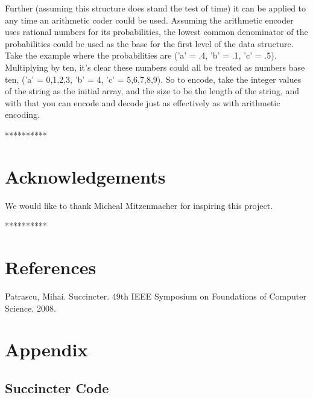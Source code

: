 \documentclass{article}
\begin{document}
Further (assuming this structure does stand the test of time) it can be applied to any time an arithmetic coder could be used. Assuming the arithmetic encoder uses rational numbers for its probabilities, the lowest common denominator of the probabilities could be used as the base for the first level of the data structure. Take the example where the probabilities are ('a' = .4,  'b' = .1, 'c' = .5). Multiplying by ten, it's clear these numbers could all be treated as numbers base ten, ('a' = 0,1,2,3, 'b' = 4, 'c' = 5,6,7,8,9). So to encode, take the integer values of the string as the initial array, and the size to be the length of the string, and with that you can encode and decode just as effectively as with arithmetic encoding.

\bigskip
\centerline{**********}
\noindent \section{Acknowledgements}
	We would like to thank Micheal Mitzenmacher for inspiring this project.

\bigskip
\centerline{**********}

\noindent \section{References}
Patrascu, Mihai. Succincter. 49th IEEE Symposium on Foundations of Computer Science. 2008.

\noindent \section{Appendix}
\noindent \subsection{Succincter Code}




\end{document}
